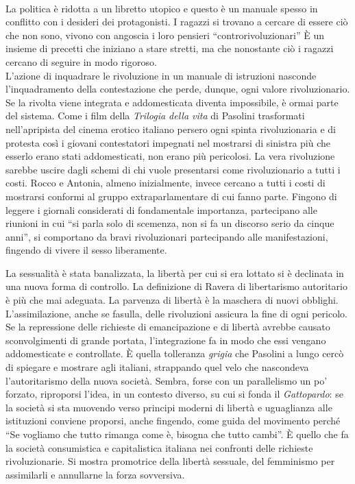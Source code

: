 \paragraph{}La politica è ridotta a un libretto utopico e questo è un manuale spesso in conflitto con i desideri dei protagonisti.
I ragazzi si trovano a cercare di essere ciò che non sono, vivono con angoscia i loro pensieri \enquote{controrivoluzionari}
È un insieme di precetti che iniziano a stare stretti, ma che nonostante ciò i ragazzi cercano di seguire in modo rigoroso.
\\L'azione di inquadrare le rivoluzione in un manuale di istruzioni nasconde l'inquadramento della contestazione che perde, dunque, ogni valore rivoluzionario.
Se la rivolta viene integrata e addomesticata diventa impossibile, è ormai parte del sistema.
Come i film della \textit{Trilogia della vita} di Pasolini trasformati nell'apripista del cinema erotico italiano persero ogni spinta rivoluzionaria e di protesta così i giovani contestatori impegnati nel mostrarsi di sinistra più che esserlo erano stati addomesticati, non erano più pericolosi.
La vera rivoluzione sarebbe uscire dagli schemi di chi vuole presentarsi come rivoluzionario a tutti i costi.
Rocco e Antonia, almeno inizialmente, invece cercano a tutti i costi di mostrarsi conformi al gruppo extraparlamentare di cui fanno parte.
Fingono di leggere i giornali considerati di fondamentale importanza, partecipano alle riunioni in cui \enquote{si parla solo di scemenza, non si fa un discorso serio da cinque anni}, si comportano da bravi rivoluzionari partecipando alle manifestazioni, fingendo di vivere il sesso liberamente.

La sessualità è stata banalizzata, la libertà per cui si era lottato si è declinata in una nuova forma di controllo.
La definizione di Ravera di libertarismo autoritario è più che mai adeguata.
La parvenza di libertà è la maschera di nuovi obblighi.
L'assimilazione, anche se fasulla, delle rivoluzioni assicura la fine di ogni pericolo.
Se la repressione delle richieste di emancipazione e di libertà avrebbe causato sconvolgimenti di grande portata, l'integrazione fa in modo che essi vengano addomesticate e controllate.
È quella tolleranza \textit{grigia} che Pasolini a lungo cercò di spiegare e mostrare agli italiani, strappando quel velo che nascondeva l'autoritarismo della nuova società.
Sembra, forse con un parallelismo un po' forzato, riproporsi l'idea, in un contesto diverso, su cui si fonda il \textit{Gattopardo}: se la società si sta muovendo verso principi moderni di libertà e uguaglianza alle istituzioni conviene proporsi, anche fingendo, come guida del movimento perché \enquote{Se vogliamo che tutto rimanga come è, bisogna che tutto cambi}.
È quello che fa la società consumistica e capitalistica italiana nei confronti delle richieste rivoluzionarie.
Si mostra promotrice della libertà sessuale, del femminismo per assimilarli e annullarne la forza sovversiva.

